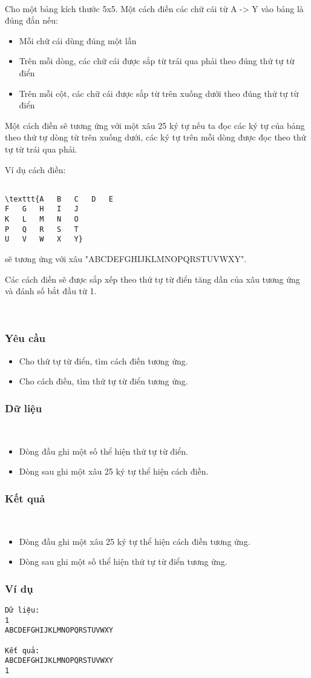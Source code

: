

 

Cho một bảng kích thước 5x5. Một cách điền các chữ cái từ A -> Y vào bảng là đúng đắn nếu:
\begin{itemize}
	\item Mỗi chữ cái dùng đúng một lần
	\item Trên mỗi dòng, các chữ cái được sắp từ trái qua phải theo đúng thứ tự từ điển
	\item Trên mỗi cột, các chữ cái được sắp từ trên xuống dưới theo đúng thứ tự từ điển
\end{itemize}

Một cách điền sẽ tương ứng với một xâu 25 ký tự nếu ta đọc các ký tự của bảng theo thứ tự dòng từ trên xuống dưới, các ký tự trên mỗi dòng được đọc theo thứ tự từ trái qua phải.

Ví dụ cách điền:
\begin{verbatim}

\texttt{A	B	C	D	E
F	G	H	I	J
K	L	M	N	O
P	Q	R	S	T
U	V	W	X	Y}\end{verbatim}

sẽ tương ứng với xâu "ABCDEFGHIJKLMNOPQRSTUVWXY".

Các cách điền sẽ được sắp xếp theo thứ tự từ điển tăng dần của xâu tương ứng và đánh số bắt đầu từ 1.

 

\subsubsection{Yêu cầu}
\begin{itemize}
	\item Cho thứ tự từ điển, tìm cách điền tương ứng.
	\item Cho cách điền, tìm thứ tự từ điển tương ứng.
\end{itemize}

\subsubsection{Dữ liệu}

 
\begin{itemize}
	\item Dòng đầu ghi một số thể hiện thứ tự từ điển.
	\item Dòng sau ghi một xâu 25 ký tự thể hiện cách điền.
\end{itemize}

\subsubsection{Kết quả}

 
\begin{itemize}
	\item Dòng đầu ghi một xâu 25 ký tự thể hiện cách điền tương ứng.
	\item Dòng sau ghi một số thể hiện thứ tự từ điển tương ứng.
\end{itemize}

\subsubsection{Ví dụ}
\begin{verbatim}
Dữ liệu:
1
ABCDEFGHIJKLMNOPQRSTUVWXY

Kết quả:
ABCDEFGHIJKLMNOPQRSTUVWXY
1
\end{verbatim}
